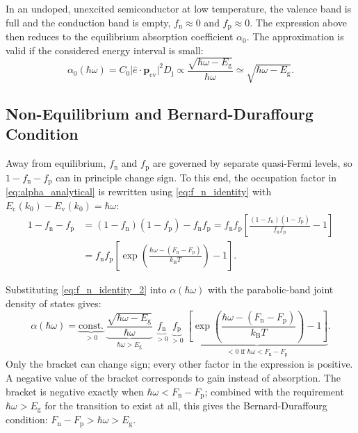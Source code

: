In an undoped, unexcited semiconductor at low temperature,
the valence band is full and the conduction band is empty,
$f_{\mathrm{n}}\approx 0$ and $f_{\mathrm{p}}\approx0$. The expression above then
reduces to the equilibrium absorption coefficient $\alpha_{0}$. The
approximation is valid if the considered energy interval is small:
\begin{equation}
	\alpha_{0}(\hbar \omega)=C_{0}\lvert \hat{e}\cdot \mathbf{p}_{\mathrm{cv}}\rvert
	^{2}D_{\mathrm{j}}\propto \frac{\sqrt{ \hbar \omega -E_{\mathrm{g}}}}{\hbar
	\omega}\simeq \sqrt{ \hbar \omega -E_{\mathrm{g}}}.
\end{equation}

\subsection{Non-Equilibrium and Bernard-Duraffourg Condition}
\label{sec:bernard_duraffourg}

Away from equilibrium, $f_{\mathrm{n}}$ and $f_{\mathrm{p}}$ are governed by
separate quasi-Fermi levels, so $1-f_{\mathrm{n}}-f_{\mathrm{p}}$ can in principle
change sign. To this end, the occupation factor in \cref{eq:alpha_analytical} is rewritten
using \cref{eq:f_n_identity} with $E_{\mathrm{c}}(k_{0})-E_{\mathrm{v}}(k_{0})=\hbar
\omega$:
\begin{align}
	1-f_{\mathrm{n}}-f_{\mathrm{p}} & =(1-f_{\mathrm{n}})(1-f_{\mathrm{p}}) - f_{\mathrm{n}}f_{\mathrm{p}}=f_{\mathrm{n}}f_{\mathrm{p}}\left[ \frac{(1-f_{\mathrm{n}})(1-f_{\mathrm{p}})}{f_{\mathrm{n}}f_{\mathrm{p}}}- 1\right] \\
	                                & =f_{\mathrm{n}}f_{\mathrm{p}}\left[\exp\left( \frac{\hbar \omega -(F_{\mathrm{n}}-F_{\mathrm{p}})}{k_{\mathrm{B}}T}\right) -1\right]. \label{eq:f_n_identity_2}
\end{align}

Substituting \cref{eq:f_n_identity_2} into $\alpha(\hbar\omega)$ with the parabolic-band
joint density of states gives:
\begin{equation}
	\alpha(\hbar \omega) = \underbrace{ \mathrm{const.} }_{ >0 }\; \underbrace{ \frac{\sqrt{
	\hbar \omega-E_{\mathrm{g}}}}{\hbar \omega} }_{ \hbar \omega >E_{\mathrm{g}} }\;
	\underbrace{ f_{\mathrm{n}} }_{ >0 }\; \underbrace{ f_{\mathrm{p}} }_{ >0 }\; \underbrace{
	\left[\exp\left( \frac{\hbar \omega -(F_{\mathrm{n}}-F_{\mathrm{p}})}{k_{\mathrm{B}}T}
	\right) -1\right] }_{ <0 \text{ if } \hbar \omega <F_{\mathrm{n}}-F_{\mathrm{p}}
	}.
\end{equation}
Only the bracket can change sign; every other factor in the expression is
positive. A negative value of the bracket corresponds to gain instead of absorption.
The bracket is negative exactly when
$\hbar\omega < F_{\mathrm{n}}-F_{\mathrm{p}}$; combined with the requirement $\hbar
\omega>E_{\mathrm{g}}$ for the transition to exist at all, this gives the
Bernard-Duraffourg condition: $F_{\mathrm{n}}-F_{\mathrm{p}}>\hbar \omega > E_{\mathrm{g}}$.

